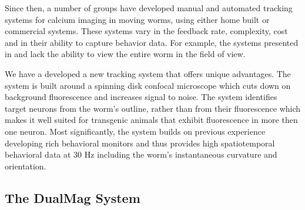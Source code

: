 Since then, a number of groups have developed manual \citep{kawano_imbalancing_2011} and automated \citep{faumont_image-free_2011, ben_arous_automated_2010, piggott_neural_2011} tracking systems for calcium imaging in moving worms, using either home built \citep{ben_arous_automated_2010, piggott_neural_2011,kawano_imbalancing_2011} or commercial \citep{faumont_image-free_2011} systems. These systems vary in the feedback rate, complexity, cost and in their ability to capture behavior data. For example, the systems presented in \citep{piggott_neural_2011} and  \citep{kawano_imbalancing_2011} lack the ability to view the entire worm in the field of view. 


We have a developed a new tracking system that offers unique advantages. The system is built around a spinning disk confocal microscope which cuts down on background fluorescence and increases signal to noise. The system identifies target neurons from the worm's outline, rather than from their fluorescence which makes it well suited for transgenic animals that exhibit fluorescence in more then one neuron. Most significantly, the system builds on previous experience developing rich behavioral monitors and thus provides high spatiotemporal behavioral data at 30 Hz including the worm's instantaneous curvature and orientation.  


\subsection{The DualMag System}

